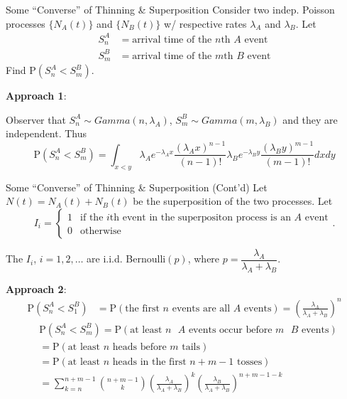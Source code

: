 \documentclass[letterpaper,handout, mathserif]{beamer}
\def\p{\mathrm P}
\begin{document}
\begin{frame}{Some ``Converse'' of Thinning \& Superposition}
Consider two indep. Poisson processes $\{N_A(t)\}$ and $\{N_B(t)\}$ w/ respective rates $\lambda_A$ and $\lambda_B$.
Let \begin{align*}
S^A_{n}&= \mbox{arrival time of the $n$th $A$ event} \\
S^B_{m}&= \mbox{arrival time of the $m$th $B$ event}
\end{align*}
Find $\p(S^A_{n} < S^B_{m})$.\bigskip

{\bf Approach 1}:

Observer that $S^A_{n}\sim Gamma(n,\lambda_A)$, $S^B_{m}\sim Gamma(m,\lambda_B)$ and they are independent.
Thus
$$
\p(S^A_{n} < S^B_{m})
=\int_{x<y}\lambda_Ae^{-\lambda_A x}\frac{(\lambda_A x)^{n-1}}{(n-1)!}  \lambda_Be^{-\lambda_B y}\frac{(\lambda_B y)^{m-1}}{(m-1)!}dxdy
$$
\end{frame}
\begin{frame}{Some ``Converse'' of Thinning \& Superposition (Cont'd)}
Let $N(t)=N_A(t)+N_B(t)$ be the superposition of the two processes.
Let $$I_i=\begin{cases}1 &\mbox{if the $i$th event in the superpositon process is an $A$ event}\\ 0&\mbox{otherwise}\end{cases}.$$

\vspace{-10pt}
The $I_i$, $i=1,2,\ldots$ are i.i.d. Bernoulli$(p)$, where $p=\dfrac{\lambda_A}{\lambda_A+\lambda_B}$.\medskip

{\bf Approach 2}:
\begin{align*}
\p(S^A_{n} < S^B_{1})
&=\p(\mbox{the first $n$ events are all $A$ events})=\left(\frac{\lambda_A}{\lambda_A+\lambda_B}\right)^n
\end{align*}\vspace{-10pt}
\begin{align*}
&\p(S^A_{n} < S^B_{m})
=\p(\mbox{at least $n$ $A$ events occur before $m$ $B$ events})\\
&=\p(\mbox{at least $n$ heads before $m$ tails})\\
&=\p(\mbox{at least $n$ heads in the first $n+m-1$ tosses})\\
&=\sum_{k=n}^{n+m-1}{n+m-1\choose k}\left(\frac{\lambda_A}{\lambda_A+\lambda_B}\right)^k\left(\frac{\lambda_B}{\lambda_A+\lambda_B}\right)^{n+m-1-k}
\end{align*}
\end{frame}
\end{document}
